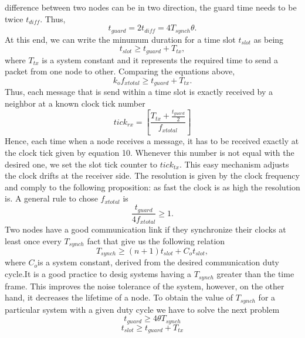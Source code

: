 \documentclass[a4paper,8pt]{report}
\begin{document}
difference between two nodes can be in two direction, the guard time
needs to be twice $t_{diff}$. Thus,
\begin{equation}
t_{guard}= 2t_{diff} = 4T_{synch}\theta.
\end{equation}
At this end, we can write the minumum duration for a time slot
$t_{slot}$ as being
\begin{equation}
t_{slot} \geq t_{guard} + T_{tx},
\end{equation}
where $T_{tx}$ is a system constant and it represents the required
time to send a packet from one node to other. Comparing the
equations above,
\begin{equation}
k_of_{xtotal} \geq t_{guard} + T_{tx}.
\end{equation}
Thus, each message that is send within a time slot is exactly
received by a neighbor at a known clock tick number
\begin{equation}
tick_{rx} = [\frac{T_{tx}+\frac{t_{guard}}{2}}{f_{xtotal}}]
\end{equation}
Hence, each time when a node receives a message, it has to be
received exactly at the clock tick given by equation 10. Whenever
this number is not equal with the desired one, we set the slot tick
counter to $tick_{tx}$. This easy mechanism adjusts the clock drifts
at the receiver side. The resolution is given by the clock frequency
and comply to the following proposition: as fast the clock is as
high the resolution is. A general rule to chose $f_{xtotal}$ is
\begin{equation}
\frac{t_{guard}}{4f_{xtotal}} \geq 1.
\end{equation}
Two nodes have a good communication link if they synchronize their
clocks at least once every $T_{synch}$ fact that give us the
following relation
\begin{equation}
T_{synch} \geq (n+1)t_{slot} + C_ot_{slot},
\end{equation}
where $C_o$is a system constant, derived from the desired
communication duty cycle.\newline It is a good practice to desig
systems having a $T_{synch}$ greater than the time frame. This
improves the noise tolerance of the system, however, on the other
hand, it decreases the lifetime of a node. To obtain the value of
$T_{synch}$ for a particular system with a given duty cycle we have
to solve the next problem
\begin{equation}
t_{guard} \geq 4\theta T_{synch}
\end{equation}
\begin{equation}
t_{slot} \geq t_{guard} + T_{tx}
\end{equation}
\end{document}

